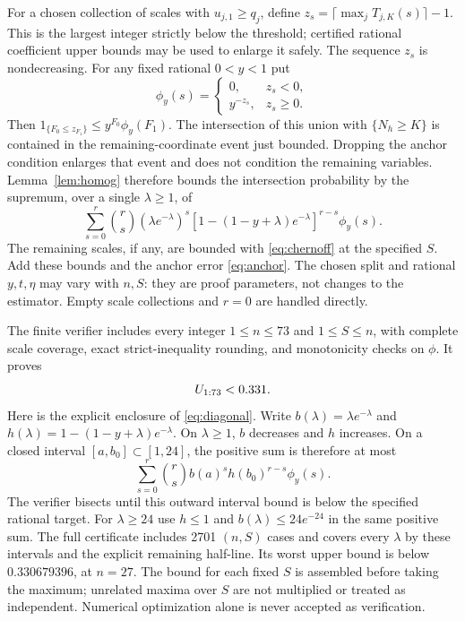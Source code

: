 \documentclass[11pt]{article}
\begin{document}
For a chosen collection of scales with $u_{j,1}\ge q_j$, define
$z_s=\lceil\max_j T_{j,K}(s)\rceil-1$.
This is the largest integer strictly below the threshold; certified
rational coefficient upper bounds may be used to enlarge it safely.
The sequence $z_s$ is nondecreasing. For any fixed rational $0<y<1$ put
\[
 \phi_y(s)=\begin{cases}0,&z_s<0,\\y^{-z_s},&z_s\ge0.\end{cases}
\]
Then
$1_{\{F_0\le z_{F_1}\}}\le y^{F_0}\phi_y(F_1)$.
The intersection of this union with $\{N_h\ge K\}$ is contained in the
remaining-coordinate event just bounded. Dropping the anchor condition
enlarges that event and does not condition the remaining variables.
Lemma~\ref{lem:homog} therefore bounds the intersection probability
by the supremum, over a single $\lambda\ge1$, of
\begin{equation}\label{eq:diagonal}
 \sum_{s=0}^r\binom rs
       (\lambda e^{-\lambda})^s
       [1-(1-y+\lambda)e^{-\lambda}]^{r-s}\phi_y(s).
\end{equation}
The remaining scales, if any, are bounded with \eqref{eq:chernoff} at
the specified $S$. Add these bounds and the anchor error
\eqref{eq:anchor}. The chosen split and rational $y,t,\eta$ may vary
with $n,S$: they are proof parameters, not changes to the estimator.
Empty scale collections and $r=0$ are handled directly.

The finite verifier includes every integer $1\le n\le73$ and
$1\le S\le n$, with complete scale coverage, exact strict-inequality
rounding, and monotonicity checks on $\phi$. It proves
\begin{equation}\label{eq:small}
 U_{1:73}<0.331.
\end{equation}
Here is the explicit enclosure of \eqref{eq:diagonal}. Write
$b(\lambda)=\lambda e^{-\lambda}$ and
$h(\lambda)=1-(1-y+\lambda)e^{-\lambda}$.
On $\lambda\ge1$, $b$ decreases and $h$ increases. On a closed interval
$[a,b_0]\subset[1,24]$, the positive sum is therefore at most
\[
 \sum_{s=0}^r\binom rs b(a)^s h(b_0)^{r-s}\phi_y(s).
\]
The verifier bisects until this outward interval bound is below the
specified rational target. For $\lambda\ge24$ use $h\le1$ and
$b(\lambda)\le24e^{-24}$ in the same positive sum.
The full certificate includes 2701 $(n,S)$ cases and covers every
$\lambda$ by these intervals and the explicit remaining half-line.
Its worst upper bound is below $0.330679396$, at $n=27$.
The bound for each fixed $S$ is assembled before taking the maximum;
unrelated maxima over $S$ are not multiplied or treated as independent.
Numerical optimization alone is never accepted as verification.
\end{document}
